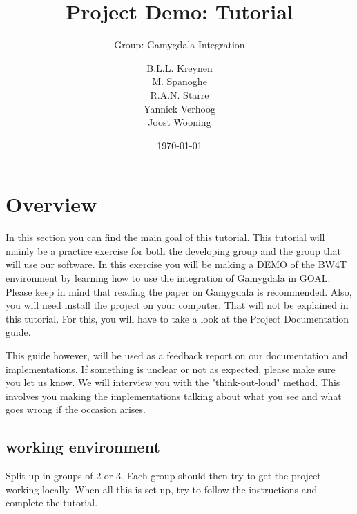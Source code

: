 \documentclass{scrartcl}
\begin{document}
\title{Project Demo: Tutorial}
\subtitle{Group: Gamygdala-Integration}
\date{\today{}}

\author{
    \begin{tabular}{l r}
      B.L.L. Kreynen\\
      M. Spanoghe\\
      R.A.N. Starre\\
      Yannick Verhoog\\
      Joost Wooning\\
    \end{tabular}
}

\maketitle \thispagestyle{empty} \pagebreak

\section{Overview}
In this section you can find the main goal of this tutorial. This tutorial will mainly be a practice exercise for both the developing group and the group that will use our software.
In this exercise you will be making a DEMO of the BW4T environment by learning how to use the integration of Gamygdala in GOAL. Please keep in mind that reading the paper on Gamygdala is recommended. Also, you will need install the project on your computer. That will not be explained in this tutorial. For this, you will have to take a look at the Project Documentation guide.\par
This guide however, will be used as a feedback report on our documentation and implementations. If something is unclear or not as expected, please make sure you let us know. We will interview you with the "think-out-loud" method. This involves you making the implementations talking about what you see and what goes wrong if the occasion arises.

\subsection{working environment}
Split up in groups of 2 or 3. Each group should then try to get the project working locally. When all this is set up, try to follow the instructions and complete the tutorial.
\end{document}

